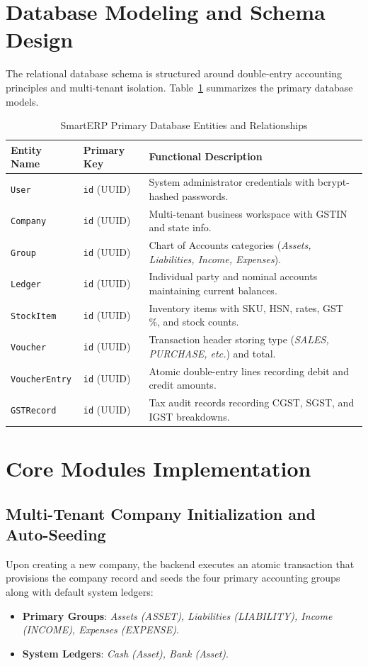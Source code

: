 \section{Database Modeling and Schema Design}
The relational database schema is structured around double-entry accounting principles and multi-tenant isolation. Table~\ref{tab:schema-summary} summarizes the primary database models.

\begin{table}[htbp]
\centering
\caption{SmartERP Primary Database Entities and Relationships}
\label{tab:schema-summary}
\begin{tabular}{llp{7.5cm}}
\toprule
\textbf{Entity Name} & \textbf{Primary Key} & \textbf{Functional Description} \\
\midrule
\texttt{User} & \texttt{id} (UUID) & System administrator credentials with bcrypt-hashed passwords. \\
\texttt{Company} & \texttt{id} (UUID) & Multi-tenant business workspace with GSTIN and state info. \\
\texttt{Group} & \texttt{id} (UUID) & Chart of Accounts categories (\textit{Assets, Liabilities, Income, Expenses}). \\
\texttt{Ledger} & \texttt{id} (UUID) & Individual party and nominal accounts maintaining current balances. \\
\texttt{StockItem} & \texttt{id} (UUID) & Inventory items with SKU, HSN, rates, GST \%, and stock counts. \\
\texttt{Voucher} & \texttt{id} (UUID) & Transaction header storing type (\textit{SALES, PURCHASE, etc.}) and total. \\
\texttt{VoucherEntry} & \texttt{id} (UUID) & Atomic double-entry lines recording debit and credit amounts. \\
\texttt{GSTRecord} & \texttt{id} (UUID) & Tax audit records recording CGST, SGST, and IGST breakdowns. \\
\bottomrule
\end{tabular}
\end{table}

\section{Core Modules Implementation}

\subsection{Multi-Tenant Company Initialization and Auto-Seeding}
Upon creating a new company, the backend executes an atomic transaction that provisions the company record and seeds the four primary accounting groups along with default system ledgers:
\begin{itemize}
    \item \textbf{Primary Groups}: \textit{Assets (ASSET), Liabilities (LIABILITY), Income (INCOME), Expenses (EXPENSE)}.
    \item \textbf{System Ledgers}: \textit{Cash (Asset), Bank (Asset)}.
\end{itemize}

